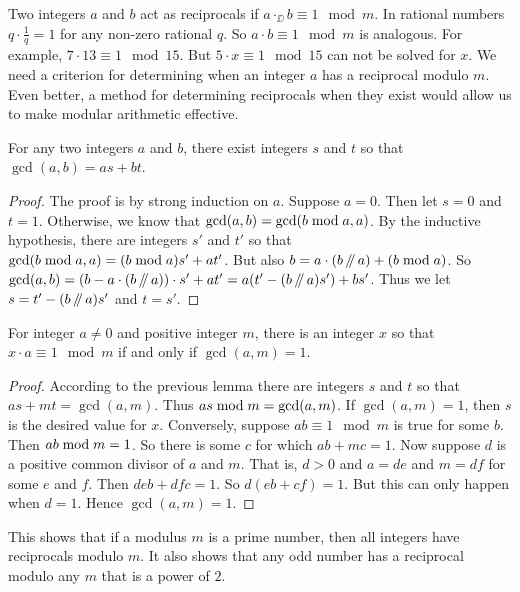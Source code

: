 Two integers $a$ and $b$ act as reciprocals if $a \cdot_\DD b\equiv 1\mod m$.
In rational numbers $q\cdot \frac1q = 1$ for any non-zero rational $q$. So $a\cdot b\equiv 1\mod m$ is analogous. For example, $7\cdot 13 \equiv 1\mod 15$. But $5\cdot x \equiv 1\mod 15$ can not be solved for $x$. We need a criterion for determining when an integer $a$ has a reciprocal modulo $m$. Even better, a method for determining reciprocals when they exist would allow us to make modular arithmetic effective. 

\begin{lem}
	For any two integers $a$ and $b$, there exist integers $s$ and $t$ so that $\gcd(a,b)=as+bt$.
	
	\begin{proof}
		The proof is by strong induction on $a$. 
		Suppose $a=0$.
		Then let $s=0$ and $t=1$. Otherwise, we know that $\gcd(a,b)=\gcd(b\bmod a, a)$. By the inductive hypothesis, there are integers $s'$ and $t'$
		so that $\gcd(b\bmod a, a)= (b\bmod a)s'+at'$. But also $b = a\cdot(b\mathop{/\mkern-5mu/} a)+(b\bmod a)$.
		So $\gcd(a,b) = (b-a\cdot(b\mathop{/\mkern-5mu/} a))\cdot s' + at'= a(t'-(b\mathop{/\mkern-5mu/} a)s') + bs'$. Thus we let $s=t'-(b\mathop{/\mkern-5mu/} a)s'$ and $t=s'$.
	\end{proof}
\end{lem}



\begin{thm}
	For integer $a\neq 0$ and positive integer $m$, there is an integer $x$ so that $x\cdot a\equiv 1\mod m$ if and only if $\gcd(a,m)=1$.
	
	\begin{proof}
		According to the previous lemma there are integers $s$ and $t$ so that $as+mt = \gcd(a,m)$. Thus $as\bmod m = \gcd(a,m)$.
		If $\gcd(a,m)=1$, then $s$ is the desired value for $x$.
		Conversely, suppose $ab\equiv 1\mod m$ is true for some $b$. Then
		$ab\bmod m = 1$. So there is some $c$ for which $ab + mc = 1$.
		Now suppose $d$ is a positive common divisor of $a$ and $m$. That is, $d>0$ and
		$a = de$ and $m = df$ for some $e$ and $f$. Then $deb + dfc = 1$. So
		$d(eb + cf) = 1$. But this can only happen when $d=1$. Hence $\gcd(a,m)=1$.
	\end{proof}
\end{thm}

This shows that if a modulus $m$ is a prime number, then all integers have reciprocals modulo $m$. It also shows that any odd number has a reciprocal modulo any $m$ that is a power of $2$. 
